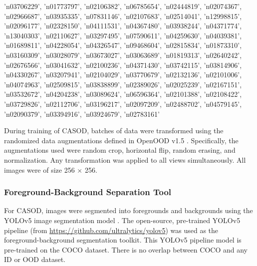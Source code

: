 \begin{itemize}
{		'n03706229', 'n01773797', 'n02106382', 'n06785654', 'n02444819', 'n02074367',
		'n02966687', 'n03935335', 'n07831146', 'n02107683', 'n02514041', 'n12998815',
		'n02096177', 'n02328150', 'n04111531', 'n04367480', 'n03938244', 'n04371774',
		'n13040303', 'n02110627', 'n03297495', 'n07590611', 'n04259630', 'n04039381',
		'n01689811', 'n04228054', 'n04326547', 'n09468604', 'n02815834', 'n01873310',
		'n03160309', 'n03028079', 'n03673027', 'n03063689', 'n01819313', 'n02640242',
		'n02676566', 'n03041632', 'n02100236', 'n04371430', 'n03742115', 'n03814906',
		'n04330267', 'n03207941', 'n02104029', 'n03770679', 'n02132136', 'n02101006',
		'n04074963', 'n02509815', 'n03838899', 'n02389026', 'n02025239', 'n02167151',
		'n03532672', 'n04204238', 'n03089624', 'n06596364', 'n02101388', 'n02108422',
		'n03729826', 'n02112706', 'n03196217', 'n02097209', 'n02488702', 'n04579145',
		'n02090379', 'n03394916', 'n03924679', 'n02783161'
	}
\end{itemize}

During training of CASOD, batches of data were transformed using the randomized data augmentations defined in OpenOOD v1.5 \cite{zhang2023openood}. Specifically, the augmentations used were random crop, horizontal flip, random erasing, and normalization. Any transformation was applied to all views simultaneously. All images were of size 256 $\times$ 256.

\subsubsection{Foreground-Background Separation Tool}
For CASOD, images were segmented into foregrounds and backgrounds using the YOLOv5 image segmentation model \cite{jocher2020ultralytics}. The open-source, pre-trained YOLOv5 pipeline (from \url{https://github.com/ultralytics/yolov5}) was used as the foreground-background segmentation toolkit. This YOLOv5 pipeline model is pre-trained on the COCO \cite{lin2014microsoft} dataset. There is no overlap between COCO and any ID or OOD dataset.

